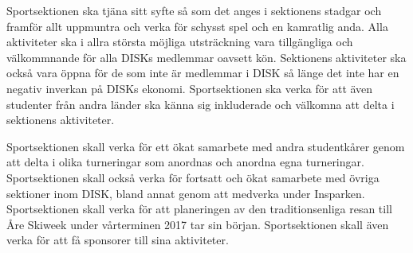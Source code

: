\documentclass[12pt,a4paper]{article}
\begin{document}
	Sportsektionen ska tjäna sitt syfte så som det anges i sektionens stadgar och framför allt uppmuntra och verka för schysst spel och en kamratlig anda. Alla aktiviteter ska i allra största möjliga utsträckning vara tillgängliga och välkommnande för alla DISKs medlemmar oavsett kön. Sektionens aktiviteter ska också vara öppna för de som inte är medlemmar i DISK så länge det inte har en negativ inverkan på DISKs ekonomi. Sportsektionen ska verka för att även studenter från andra länder ska känna sig inkluderade och välkomna att delta i sektionens aktiviteter.

	Sportsektionen skall verka för ett ökat samarbete med andra studentkårer genom att delta i olika turneringar som anordnas och anordna egna turneringar. Sportsektionen skall också verka för fortsatt och ökat samarbete med övriga sektioner inom DISK, bland annat genom att medverka under Insparken. Sportsektionen skall verka för att planeringen av den traditionsenliga  resan till Åre Skiweek under vårterminen 2017 tar sin början. Sportsektionen skall även verka för att få sponsorer till sina aktiviteter.
\end{document}
